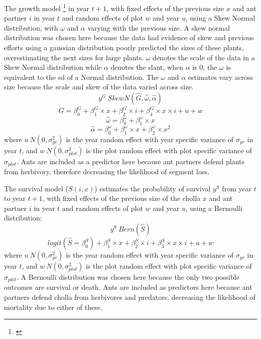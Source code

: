 \documentclass[11pt]{article}
\newcommand{\ali}[2]{{\color{pink}{#1}}\footnote{\textit{\color{pink}{#2}}}}
\begin{document}
The growth model \ali{($G(x',x,i)$) estimates the size of cholla $y^G$}{This is where I get a little confused between the x and x' sizes and the ys. Should this all be noted like this?} in year $t+1$, with fixed effects of the previous size $x$ and ant partner $i$ in year $t$ and random effects of plot $w$ and year $u$, using a Skew Normal distribution, with $\omega$ and $\alpha$ varying with the previous size. 
A skew normal distribution was chosen here because the data had evidence of skew and previous efforts using a gaussian distribution poorly predicted the sizes of these plants, overestimating the next sizes for large plants.
$\omega$ denotes the scale of the data in a Skew Normal distribution while $\alpha$ denotes the slant, when $\alpha$ is 0, the $\omega$ is equivalent to the sd of a Normal distribution. 
The $\omega$ and $\alpha$ estimates vary across size because the scale and skew of the data varied across size. 
$$y^G ~ Skew N(\hat{G},\hat{\omega},\hat{\alpha})$$
$$\hat{G} = \beta_{0}^{G} + \beta_{1}^{G} \times x + \beta_{2}^{G} \times i + \beta_{4}^{G} \times x \times i + u + w$$
$$\hat{\omega} = \beta_{0}^{\omega} + \beta_{1}^{\omega} \times x$$
$$\hat{\alpha} = \beta_{0}^{\omega} + \beta_{1}^{\omega} \times x + \beta_{2}^{\omega} \times x^2$$
where $u ~ N(0,\sigma_{yr}^{2})$ is the year random effect with year specific variance of $\sigma_{yr}$ in year $t$, and $w ~ N(0,\sigma_{plot}^{2})$ is the plot random effect with plot specific variance of $\sigma_{plot}$.
Ants are included as a predictor here because ant partners defend plants from herbivory, therefore decreasing the likelihood of segment loss.

The survival model ($S(i,x)$) estimates the probability of survival $y^S$ from year $t$ to year $t+1$, with fixed effects of the previous size of the cholla $x$ and ant partner $i$ in year $t$ and random effects of plot $w$ and year $u$, using a Bernoulli distribution:
$$y^S ~ Bern(\hat{S})$$
$$logit(\hat{S} = \beta_{0}^{S}) + \beta_{1}^{S} \times x + \beta_{2}^{S} \times i + \beta_{3}^{S} \times x \times i + u + w$$
where $u ~ N(0,\sigma_{yr}^{2})$ is the year random effect with year specific variance of $\sigma_{yr}$ in year $t$, and $w ~ N(0,\sigma_{plot}^{2})$ is the plot random effect with plot specific variance of $\sigma_{plot}$.
A Bernoulli distribution was chosen here because the only two possible outcomes are survival or death. 
Ants are included as predictors here because ant partners defend cholla from herbivores and predators, decreasing the likelihood of mortality due to either of these. 
\end{document}
